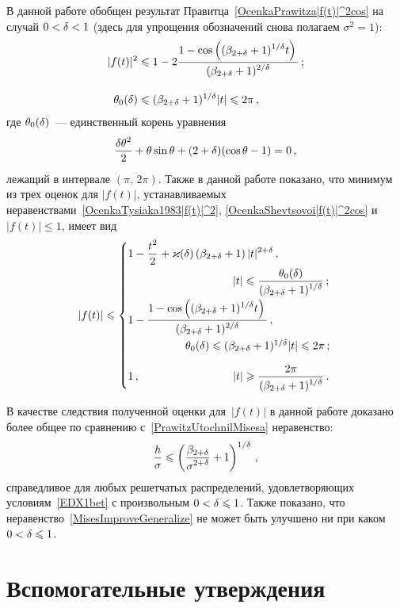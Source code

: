 \begin{multicols}{2}
В данной работе обобщен результат
Правитца~\eqref{OcenkaPrawitza|f(t)|^2cos} на случай $0<\delta<1$ (здесь
для упрощения обозначений снова полагаем $\sigma^2=1$):
\begin{align}
|f(t)|^2 & \leqslant1- 2 \displaystyle\frac{\displaystyle 1-\cos\left((\beta_{2+\delta}+1)^{1/\delta} t\right)\mathstrut}{\displaystyle (\beta_{2+\delta}+1)^{2/\delta}\mathstrut}\,;\notag\\[-6pt]
 &\label{OcenkaShevtsovoi|f(t)|^2cos}\\
\theta_0(\delta) & \leqslant (\beta_{2+\delta}+1)^{1/\delta}|t|  \leqslant2\pi\,,\notag
\end{align}
где $\theta_0(\delta)$~--- единственный корень уравнения
$$
\displaystyle\frac{\displaystyle \delta\theta^2\mathstrut}{\displaystyle 2\mathstrut}+ \theta\sin \theta + (2+\delta)(\cos \theta - 1)=0\,,
$$
лежащий в интервале $(\pi,\,2\pi)$. Также в данной работе показано,
что минимум из трех оценок для $|f(t)|$, устанавливаемых
неравенствами~\eqref{OcenkaTysiaka1983|f(t)|^2},
\eqref{OcenkaShevtsovoi|f(t)|^2cos} и $|f(t)|\le1$, имеет вид
$$
|f(t)|\le
\begin{cases}
 1-\fr{t^2}2+\varkappa(\d)\left(\beta_{2+\d}+
 1\right)|t|^{2+\d}\,, \\[6pt]
\hspace*{95pt} |t|\le\fr{\theta_0(\d)}{(\bet+1)^{1/\d}}\,;\hspace*{-8pt}  \\[9pt]
 1-\fr{1-\cos\left((\bet+1)^{1/\d} t\right)}
 {(\bet+1)^{2/\d}}\,,\\[9pt]
 \hspace*{52pt} \theta_0(\d)\le (\bet+1)^{1/\d}|t|  \le2\pi\,;\hspace*{-8pt}  \\[9pt]
    1\,, \hspace*{84pt} |t|\ge\fr{2\pi}{(\bet+1)^{1/\d}}\,.\hspace*{-8pt}
\end{cases}
$$

В качестве следствия полученной оценки для~$|f(t)|$ в данной работе
доказано более общее по сравнению с~\eqref{PrawitzUtochnilMisesa}
неравенство:
\begin{equation}
\label{MisesImproveGeneralize}
\displaystyle\frac{\displaystyle h\mathstrut}{\displaystyle \sigma\mathstrut}\leqslant\left(\displaystyle\frac{\displaystyle \beta_{2+\delta}\mathstrut}{\displaystyle \sigma^{2+\delta}\mathstrut}+
1\right)^{1/\delta}\,,
\end{equation}
справедливое для любых решетчатых распределений, удовлетворяющих
условиям~\eqref{EDX1bet} с произвольным $0<\delta\leqslant1$. Также показано,
что неравенство~\eqref{MisesImproveGeneralize} не может быть
улучшено ни при каком $0<\delta\leqslant1$.

\section{Вспомогательные утверждения}


\end{multicols}
